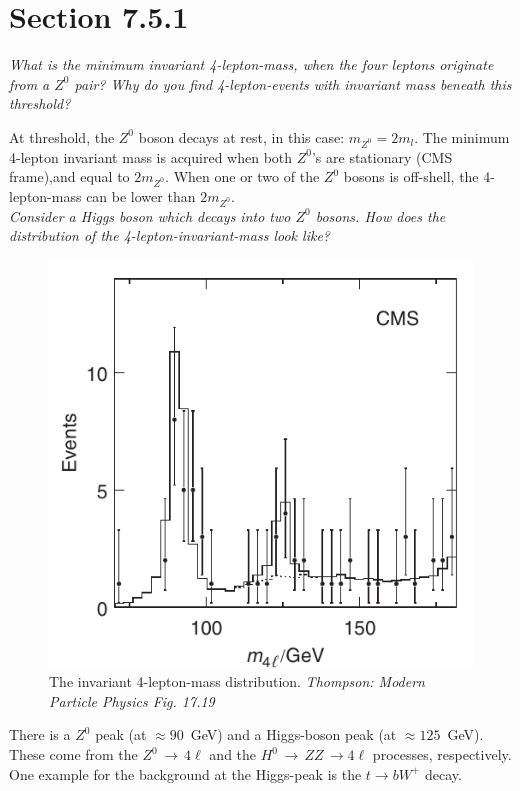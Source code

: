 \documentclass{article}
\begin{document}
\section{Section 7.5.1}
\textit{What is the minimum invariant 4-lepton-mass, when the four leptons originate from a $Z^0$ pair? Why do you find 4-lepton-events with invariant mass beneath this threshold?}\\
\par At threshold, the $Z^0$ boson decays at rest, in this case: $m_{Z^0} = 2 m_l$. The minimum 4-lepton invariant mass is acquired when both $Z^0$'s are stationary (CMS frame),and equal to $2m_{Z^0}$. When one or two of the $Z^0$ bosons is off-shell, the 4-lepton-mass can be lower than $2 m_{Z^0}$. \\[14pt]
\textit{Consider a Higgs boson which decays into two $Z^0$ bosons. How does the distribution of the 4-lepton-invariant-mass look like?}\\
\begin{figure}
\centering
\includegraphics[scale=0.5]{Images/Z0peak.png}
\caption{The invariant 4-lepton-mass distribution. \textit{Thompson: Modern Particle Physics Fig. 17.19}}
\end{figure}
\par There is a $Z^0$ peak (at $\approx 90$~GeV) and a Higgs-boson peak (at $\approx 125$~GeV). These come from the $Z^0 \, \rightarrow \, 4\ell$ and the $H^0 \, \rightarrow \, Z Z \, \rightarrow 4 \ell$ processes, respectively.  One example for the background at the Higgs-peak is the $t \rightarrow bW^+$ decay.\\[14pt]
\end{document}
